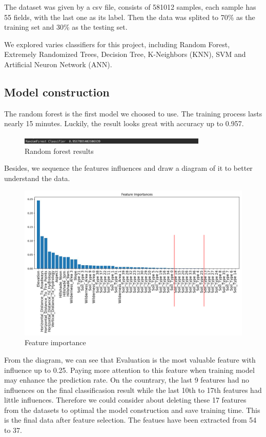 \documentclass[11pt,en]{elegantpaper}
\begin{document}
The dataset was given by a csv file, consists of 581012 samples, each sample has 55 fields, with the last one as its label. Then the data was splited to 70\% as the training set and 30\% as the testing set.

We explored varies classifiers for this project, including Random Forest, Extremely Randomized Trees, Decision Tree, K-Neighbors (KNN), SVM and Artificial Neuron Network (ANN).

\subsection{Model construction}
The random forest is the first model we choosed to use. The training process lasts nearly 15 minutes. Luckily, the result looks great with accuracy up to 0.957.
\begin{figure}[H]
	\centering
	\includegraphics[width=0.8\textwidth]{image/rf.png}
	\caption{Random forest results}
	\label{rf}
\end{figure}
Besides, we sequence the features influences and draw a diagram of it to better understand the data.
\begin{figure}[H]
	\centering
	\includegraphics[width=1\textwidth]{image/feature importance.jpg}
	\caption{Feature importance}
	\label{feature importance}
\end{figure}
From the diagram, we can see that Evaluation is the most valuable feature with influence up to 0.25. Paying more attention to this feature when training model may enhance the prediction rate. On the countrary, the last 9 features had no influences on the final classificasion result while the last 10th to 17th features had little influences. Therefore we could consider about deleting these 17 features from the datasets to optimal the model construction and save training time. This is the final data after feature selection. The featues have been extracted from 54 to 37.
\end{document}
